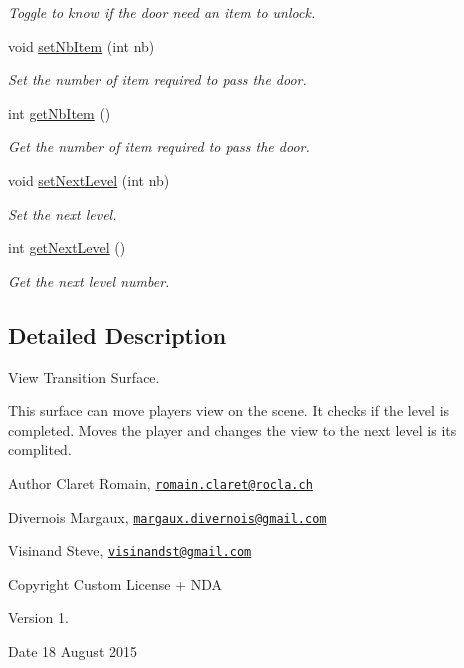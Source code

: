 \begin{DoxyCompactItemize}
\begin{DoxyCompactList}\small\item\em Toggle to know if the door need an item to unlock. \end{DoxyCompactList}\item 
void \hyperlink{class_s___door_a7031028a3e58158698e1eee212f553f6}{set\+Nb\+Item} (int nb)
\begin{DoxyCompactList}\small\item\em Set the number of item required to pass the door. \end{DoxyCompactList}\item 
int \hyperlink{class_s___door_a97b43c424fa12e7f81d42db05185c4f6}{get\+Nb\+Item} ()
\begin{DoxyCompactList}\small\item\em Get the number of item required to pass the door. \end{DoxyCompactList}\item 
void \hyperlink{class_s___door_a2cf82387100fbaaf1997bff0cb80f61d}{set\+Next\+Level} (int nb)
\begin{DoxyCompactList}\small\item\em Set the next level. \end{DoxyCompactList}\item 
int \hyperlink{class_s___door_a9562af975d74681c491e5172efa7a2d9}{get\+Next\+Level} ()
\begin{DoxyCompactList}\small\item\em Get the next level number. \end{DoxyCompactList}\end{DoxyCompactItemize}


\subsection{Detailed Description}
View Transition Surface. 

This surface can move player\textquotesingle{}s view on the scene. It checks if the level is completed. Moves the player and changes the view to the next level is it\textquotesingle{}s complited. \begin{DoxyAuthor}{Author}
Claret Romain, \href{mailto:romain.claret@rocla.ch}{\tt romain.\+claret@rocla.\+ch} 

Divernois Margaux, \href{mailto:margaux.divernois@gmail.com}{\tt margaux.\+divernois@gmail.\+com} 

Visinand Steve, \href{mailto:visinandst@gmail.com}{\tt visinandst@gmail.\+com} 
\end{DoxyAuthor}
\begin{DoxyCopyright}{Copyright}
Custom License + N\+D\+A 
\end{DoxyCopyright}
\begin{DoxyVersion}{Version}
1. 
\end{DoxyVersion}
\begin{DoxyDate}{Date}
18 August 2015 
\end{DoxyDate}


